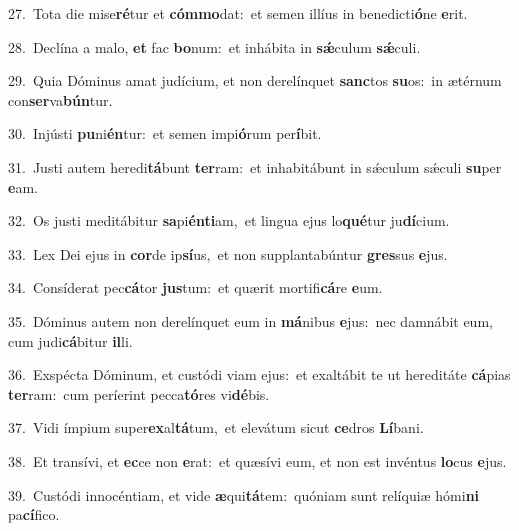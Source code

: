 {\numbfont\textcolor{\numbcolor}{27.}}~Tota die mise\-\textbf{ré}\-tur et \textbf{cóm}\-\textbf{mo}dat:~\star et semen illíus in benedicti\-\textbf{ó}\-ne \textbf{e}\-rit.\par
{\numbfont\textcolor{\numbcolor}{28.}}~Declína a malo, \textbf{et} fac \textbf{bo}\-num:~\star et inhábita in \textbf{sǽ}\-culum \textbf{sǽ}\-culi.\par
{\numbfont\textcolor{\numbcolor}{29.}}~Quia Dóminus amat judícium, et non derelínquet \textbf{sanc}\-tos \textbf{su}\-os:~\star in ætérnum con\-\textbf{ser}\-va\-\textbf{bún}\-tur.\par
{\numbfont\textcolor{\numbcolor}{30.}}~Injústi \textbf{pu}\-ni\-\textbf{én}\-tur:~\star et semen impi\-\textbf{ó}\-rum per\-\textbf{í}\-bit.\par
{\numbfont\textcolor{\numbcolor}{31.}}~Justi autem heredi\-\textbf{tá}\-bunt \textbf{ter}\-ram:~\star et inhabitábunt in sǽculum sǽculi \textbf{su}\-per \textbf{e}\-am.\par
{\numbfont\textcolor{\numbcolor}{32.}}~Os justi meditábitur \textbf{sa}\-pi\-\textbf{én}\-\textbf{ti}am,~\star et lingua ejus lo\-\textbf{qué}\-tur ju\-\textbf{dí}\-cium.\par
{\numbfont\textcolor{\numbcolor}{33.}}~Lex Dei ejus in \textbf{cor}\-de ip\-\textbf{sí}\-us,~\star et non supplantabúntur \textbf{gres}\-sus \textbf{e}\-jus.\par
{\numbfont\textcolor{\numbcolor}{34.}}~Consíderat pec\-\textbf{cá}\-tor \textbf{jus}\-tum:~\star et quærit mortifi\-\textbf{cá}\-re \textbf{e}\-um.\par
{\numbfont\textcolor{\numbcolor}{35.}}~Dóminus autem non derelínquet eum in \textbf{má}\-nibus \textbf{e}\-jus:~\star nec damnábit eum, cum judi\-\textbf{cá}\-bitur \textbf{il}\-li.\par
{\numbfont\textcolor{\numbcolor}{36.}}~Exspécta Dóminum, et custódi viam ejus:~\dagger et exaltábit te ut hereditáte \textbf{cá}\-pias \textbf{ter}\-ram:~\star cum períerint pecca\-\textbf{tó}\-res vi\-\textbf{dé}\-bis.\par
{\numbfont\textcolor{\numbcolor}{37.}}~Vidi ímpium super\-\textbf{ex}\-al\-\textbf{tá}\-tum,~\star et elevátum sicut \textbf{ce}\-dros \textbf{Lí}\-bani.\par
{\numbfont\textcolor{\numbcolor}{38.}}~Et transívi, et \textbf{ec}\-ce non \textbf{e}\-rat:~\star et quæsívi eum, et non est invéntus \textbf{lo}\-cus \textbf{e}\-jus.\par
{\numbfont\textcolor{\numbcolor}{39.}}~Custódi innocéntiam, et vide \textbf{æ}\-qui\-\textbf{tá}\-tem:~\star quóniam sunt relíquiæ hómi\textbf{ni} pa\-\textbf{cí}\-fico.\par

